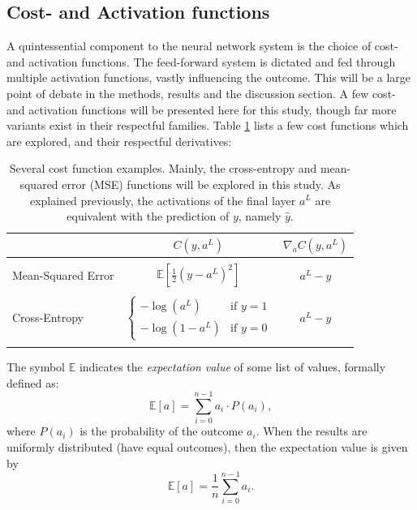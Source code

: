     \subsection{Cost- and Activation functions}
        A quintessential component to the neural network system is the choice of cost- and activation functions. The feed-forward system is dictated and fed through multiple activation functions, vastly influencing the outcome. This will be a large point of debate in the methods, results and the discussion section. A few cost- and activation functions will be presented here for this study, though far more variants exist in their respectful families. Table \ref{tab:cost_functions} lists a few cost functions which are explored, and their respectful derivatives:
        \begin{table}[H]
            \centering
            \begin{tabular}[t]{l@{\hskip 0.1in}c@{\hskip 0.1in}c}
                \toprule
                 & $C(y, a^L)$ & $\nabla_aC(y, a^L)$\\
                \midrule
                 &  & \\
                Mean-Squared Error & $\mathds{E} \left[ \frac12 (y-a^L)^2\right]$ & $a^L-y$ \\ & & \\
                Cross-Entropy & $\begin{cases}-\log(a^L) & \text{if } y=1\\ -\log(1-a^L) & \text{if } y=0\end{cases}$ & $a^L-y$ \\ & & \\
                \bottomrule
            \end{tabular}
            \caption{Several cost function examples. Mainly, the cross-entropy and mean-squared error (MSE) functions will be explored in this study. As explained previously, the activations of the final layer $a^L$ are equivalent with the prediction of $y$, namely $\hat{y}$. }
            \label{tab:cost_functions}
        \end{table}
        The symbol $\mathds{E}$ indicates the \textit{expectation value} of some list of values, formally defined as:
        \begin{equation}
            \mathds{E}\left[a\right] = \sum_{i=0}^{n-1} a_i \cdot P(a_i),
        \end{equation}
        where $P(a_i)$ is the probability of the outcome $a_i$. When the results are uniformly distributed (have equal outcomes), then the expectation value is given by
        \begin{equation}
            \mathds{E}\left[a\right] = \frac1n\sum_{i=0}^{n-1} a_i.
        \end{equation}
